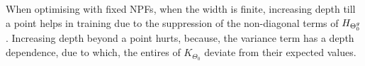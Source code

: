 When optimising with fixed NPFs, when the width is finite, increasing depth till a point helps in training due to the suppression of the non-diagonal terms of $H_{{\Theta}^g_0}$. Increasing depth beyond a point hurts, because, the variance term has a depth dependence, due to which, the entires of $K_{\Theta_0}$ deviate from their expected values.

